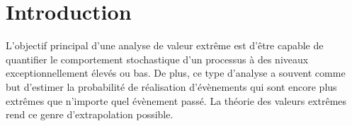 \chapter*{Introduction}
\label{chap:introduction} 

L'objectif principal d'une analyse de valeur extrême est d'être capable de quantifier le comportement stochastique d'un processus à des niveaux exceptionnellement élevés ou bas. De plus, ce type d'analyse a souvent comme but d'estimer la probabilité de réalisation d'évènements qui sont encore plus extrêmes que n'importe quel évènement passé. La théorie des valeurs extrêmes rend ce genre d'extrapolation possible.